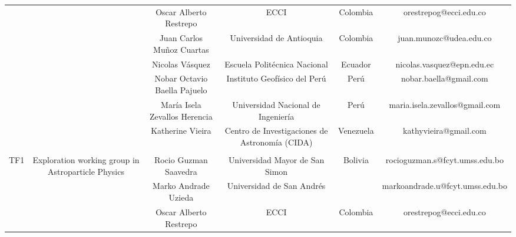 \begin{table}[H]
{\begin{tabular}{cccccc}
\multicolumn{1}{c|}{} & \multicolumn{1}{c|}{} & \multicolumn{1}{c|}{Oscar Alberto Restrepo} & \multicolumn{1}{c|}{ECCI} & \multicolumn{1}{c|}{Colombia} & \multicolumn{1}{c|}{orestrepog@ecci.edu.co} \\ \cline{3-6} 
\multicolumn{1}{c|}{} & \multicolumn{1}{c|}{} & \multicolumn{1}{c|}{Juan Carlos Muñoz Cuartas} & \multicolumn{1}{c|}{Universidad de Antioquia} & \multicolumn{1}{c|}{Colombia} & \multicolumn{1}{c|}{juan.munozc@udea.edu.co} \\ \cline{3-6} 
\multicolumn{1}{c|}{} & \multicolumn{1}{c|}{} & \multicolumn{1}{c|}{Nicolas Vásquez} & \multicolumn{1}{c|}{Escuela Politécnica Nacional} & \multicolumn{1}{c|}{Ecuador} & \multicolumn{1}{c|}{nicolas.vasquez@epn.edu.ec} \\ \cline{3-6} 
\multicolumn{1}{c|}{} & \multicolumn{1}{c|}{} & \multicolumn{1}{c|}{Nobar Octavio Baella Pajuelo} & \multicolumn{1}{c|}{Instituto Geofísico del Perú} & \multicolumn{1}{c|}{Perú} & \multicolumn{1}{c|}{nobar.baella@gmail.com} \\ \cline{3-6} 
\multicolumn{1}{c|}{} & \multicolumn{1}{c|}{} & \multicolumn{1}{c|}{María Isela Zevallos Herencia} & \multicolumn{1}{c|}{Universidad Nacional de Ingeniería} & \multicolumn{1}{c|}{Perú} & \multicolumn{1}{c|}{maria.isela.zevallos@gmail.com} \\ \cline{3-6} 
\multicolumn{1}{c|}{} & \multicolumn{1}{c|}{} & \multicolumn{1}{c|}{Katherine Vieira} & \multicolumn{1}{c|}{Centro de Investigaciones de Astronomía (CIDA)} & \multicolumn{1}{c|}{Venezuela} & \multicolumn{1}{c|}{kathyvieira@gmail.com} \\ \cline{2-6} 
 &  &  &  &  &  \\ \hline
\multicolumn{1}{|c|}{TF1} & \multicolumn{1}{c|}{\multirow{8}{*}{Exploration working group in Astroparticle Physics}} & \multicolumn{1}{c|}{Rocio Guzman Saavedra} & \multicolumn{1}{c|}{Universidad Mayor de San Simon} & \multicolumn{1}{c|}{Bolivia} & \multicolumn{1}{c|}{rocioguzman.s@fcyt.umss.edu.bo} \\ \cline{1-1} \cline{3-6} 
\multicolumn{1}{c|}{} & \multicolumn{1}{c|}{} & \multicolumn{1}{c|}{Marko Andrade Uzieda} & \multicolumn{1}{c|}{Universidad de San Andrés} & \multicolumn{1}{c|}{} & \multicolumn{1}{c|}{markoandrade.u@fcyt.umss.edu.bo} \\ \cline{3-6} 
\multicolumn{1}{c|}{} & \multicolumn{1}{c|}{} & \multicolumn{1}{c|}{Oscar Alberto Restrepo} & \multicolumn{1}{c|}{ECCI} & \multicolumn{1}{c|}{Colombia} & \multicolumn{1}{c|}{orestrepog@ecci.edu.co} \\ \cline{3-6} 

\end{tabular}}
\end{table}
